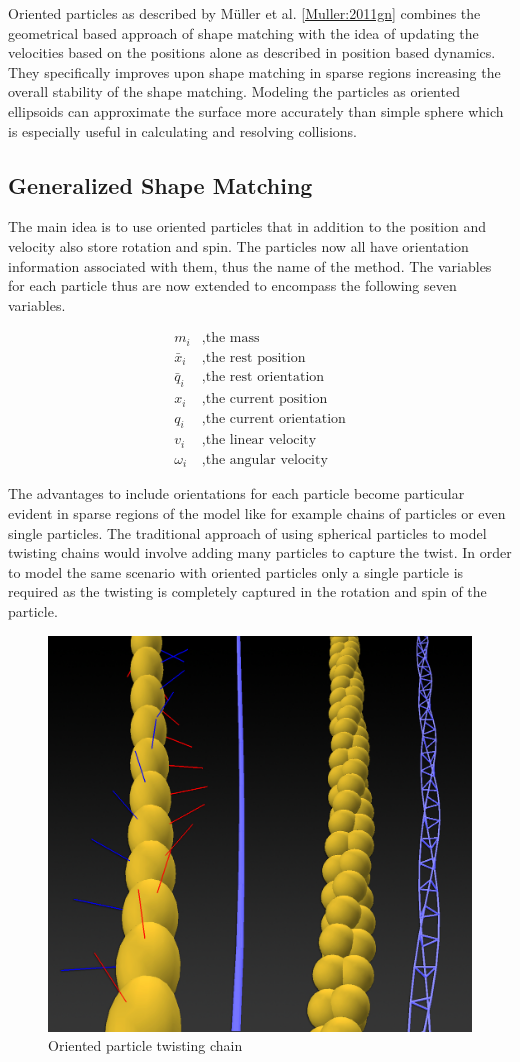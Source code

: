 Oriented particles as described by M{\"u}ller et al. \ref{Muller:2011gn} combines the geometrical based approach of shape matching with the idea of updating the velocities based on the positions alone as described in position based dynamics. They specifically improves upon shape matching in sparse regions increasing the overall stability of the shape matching. Modeling the particles as oriented ellipsoids can approximate the surface more accurately than simple sphere which is especially useful in calculating and resolving collisions.

\subsection{Generalized Shape Matching}
The main idea is to use oriented particles that in addition to the position and velocity also store rotation and spin. The particles now all have orientation information associated with them, thus the name of the method. The variables for each particle thus are now extended to encompass the following seven variables.

\begin{align*}
m_i &, \text{the mass} \\
\bar{x}_i &, \text{the rest position} \\
\bar{q}_i &, \text{the rest orientation} \\
x_i &, \text{the current position} \\
q_i &, \text{the current orientation} \\
v_i &, \text{the linear velocity} \\
\omega_i &, \text{the angular velocity}
\end{align*}

The advantages to include orientations for each particle become particular evident in sparse regions of the model like for example chains of particles or even single particles. The traditional approach of using spherical particles to model twisting chains would involve adding many particles to capture the twist. In order to model the same scenario with oriented particles only a single particle is required as the twisting is completely captured in the rotation and spin of the particle.

\begin{figure}[htb]
\centering
\includegraphics[width=.5\textwidth]{images/oriented_particle_twist_chain.png}
\caption{Oriented particle twisting chain}
\label{img:rigid_body}
\end{figure}

